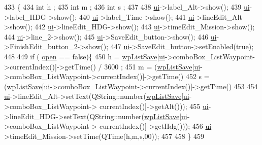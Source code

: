 \begin{DoxyCode}
433                     \{
434     \textcolor{keywordtype}{int} h ;
435     \textcolor{keywordtype}{int} m ;
436     \textcolor{keywordtype}{int} s ;
437 
438     \hyperlink{a00015_a4f4e978b71511ee6fcb91ef1a4e3c17c}{ui}->label\_Alt->show();
439     \hyperlink{a00015_a4f4e978b71511ee6fcb91ef1a4e3c17c}{ui}->label\_HDG->show();
440     \hyperlink{a00015_a4f4e978b71511ee6fcb91ef1a4e3c17c}{ui}->label\_Time->show();
441     \hyperlink{a00015_a4f4e978b71511ee6fcb91ef1a4e3c17c}{ui}->lineEdit\_Alt->show();
442     \hyperlink{a00015_a4f4e978b71511ee6fcb91ef1a4e3c17c}{ui}->lineEdit\_HDG->show();
443     \hyperlink{a00015_a4f4e978b71511ee6fcb91ef1a4e3c17c}{ui}->timeEdit\_Mission->show();
444     \hyperlink{a00015_a4f4e978b71511ee6fcb91ef1a4e3c17c}{ui}->line\_2->show();
445     \hyperlink{a00015_a4f4e978b71511ee6fcb91ef1a4e3c17c}{ui}->SaveEdit\_button->show();
446     \hyperlink{a00015_a4f4e978b71511ee6fcb91ef1a4e3c17c}{ui}->FinishEdit\_button\_2->show();
447     \hyperlink{a00015_a4f4e978b71511ee6fcb91ef1a4e3c17c}{ui}->SaveEdit\_button->setEnabled(\textcolor{keyword}{true});
448 
449     \textcolor{keywordflow}{if} ( \hyperlink{a00042_a8c7e45250b1eb6821dd59fb2a9a016d7}{open} == \textcolor{keyword}{false})\{
450         h = \hyperlink{a00042_afe5800195fe7a91ea1bad152ba9113b5}{wpListSave}[\hyperlink{a00015_a4f4e978b71511ee6fcb91ef1a4e3c17c}{ui}->comboBox\_ListWaypoint->currentIndex()]->getTime() / 3600 ;
451         m = (\hyperlink{a00042_afe5800195fe7a91ea1bad152ba9113b5}{wpListSave}[\hyperlink{a00015_a4f4e978b71511ee6fcb91ef1a4e3c17c}{ui}->comboBox\_ListWaypoint->currentIndex()]->getTime() %
452         s = (\hyperlink{a00042_afe5800195fe7a91ea1bad152ba9113b5}{wpListSave}[\hyperlink{a00015_a4f4e978b71511ee6fcb91ef1a4e3c17c}{ui}->comboBox\_ListWaypoint->currentIndex()]->getTime() %
453 
454        \hyperlink{a00015_a4f4e978b71511ee6fcb91ef1a4e3c17c}{ui}->lineEdit\_Alt->setText(QString::number(\hyperlink{a00042_afe5800195fe7a91ea1bad152ba9113b5}{wpListSave}[\hyperlink{a00015_a4f4e978b71511ee6fcb91ef1a4e3c17c}{ui}->comboBox\_ListWaypoint->
      currentIndex()]->getAlt()));
455        \hyperlink{a00015_a4f4e978b71511ee6fcb91ef1a4e3c17c}{ui}->lineEdit\_HDG->setText(QString::number(\hyperlink{a00042_afe5800195fe7a91ea1bad152ba9113b5}{wpListSave}[\hyperlink{a00015_a4f4e978b71511ee6fcb91ef1a4e3c17c}{ui}->comboBox\_ListWaypoint->
      currentIndex()]->getHdg()));
456        \hyperlink{a00015_a4f4e978b71511ee6fcb91ef1a4e3c17c}{ui}->timeEdit\_Mission->setTime(QTime(h,m,s,00));
457 
458     \}
459 

\end{DoxyCode}
